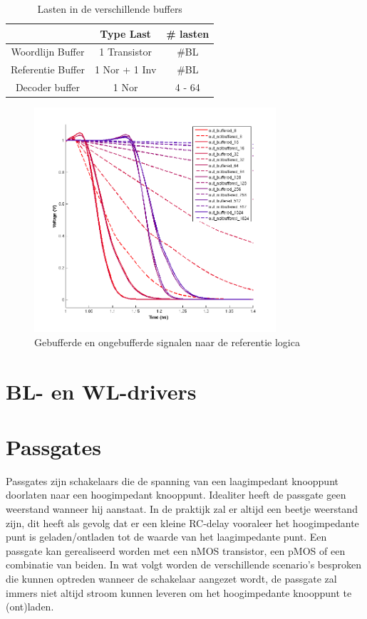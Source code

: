 \begin{table}
\begin{center}
\begin{tabular}{ccc}
\hline
 & Type Last & \# lasten\\
\hline
Woordlijn Buffer & 1 Transistor &  \#BL\\
Referentie Buffer & 1 Nor + 1 Inv &  \#BL\\
Decoder buffer & 1 Nor & 4 - 64\\
\hline
\end{tabular}
\end{center}
\caption{Lasten in de verschillende buffers}
\label{tab:buffer}
\end{table}

\begin{figure}[!ht]
  \centering
  \includegraphics[width=0.8\textwidth]{../fig/hfdst-buffers-refbuffer.png}
  \caption{Gebufferde en ongebufferde signalen naar de referentie logica}
  \label{fig:refbuffer}
\end{figure}

\section{BL- en WL-drivers}

\section{Passgates}
Passgates zijn schakelaars die de spanning van een laagimpedant knooppunt doorlaten naar een hoogimpedant knooppunt. Idealiter heeft de passgate geen weerstand wanneer hij aanstaat. In de praktijk zal er altijd een beetje weerstand zijn, dit heeft als gevolg dat er een kleine RC-delay vooraleer het hoogimpedante punt is geladen/ontladen tot de waarde van het laagimpedante punt.
Een passgate kan gerealiseerd worden met een nMOS transistor, een pMOS of een combinatie van beiden.
In wat volgt worden de verschillende scenario's besproken die kunnen optreden wanneer de schakelaar aangezet wordt, de passgate zal immers niet altijd stroom kunnen leveren om het hoogimpedante knooppunt te (ont)laden.

